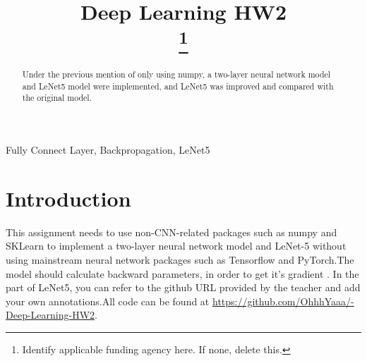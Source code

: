 \documentclass[conference]{IEEEtran}
\begin{document}
\title{Deep Learning HW2\\
\thanks{Identify applicable funding agency here. If none, delete this.}
 
}

\author{


}


\maketitle

\begin{abstract}
Under the previous mention of only using numpy, a two-layer neural network model and LeNet5 model were implemented, and LeNet5 was improved and compared with the original model.
\end{abstract}

\begin{IEEEkeywords}
Fully Connect Layer, Backpropagation, LeNet5
\end{IEEEkeywords}

\section{Introduction}

This assignment needs to use non-CNN-related packages such as numpy and SKLearn to implement a two-layer neural network model and LeNet-5 without using mainstream neural network packages such as Tensorflow and PyTorch.The model should calculate backward  parameters, in order to get it's gradient . In the part of LeNet5, you can refer to the github URL provided by the teacher and add your own annotations.All code can be found at \href{https://github.com/OhhhYaaa/-Deep-Learning-HW2}{https://github.com/OhhhYaaa/-Deep-Learning-HW2}.
\end{document}
